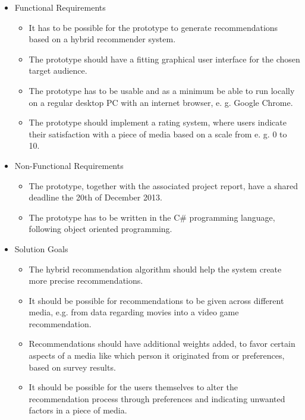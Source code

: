 \begin{itemize}
	\item Functional Requirements
	\begin{itemize}
		\item It has to be possible for the prototype to generate recommendations based on a hybrid recommender system.
		\item The prototype should have a fitting graphical user interface for the chosen target audience.
		\item The prototype has to be usable and as a minimum be able to run locally on a regular desktop PC with an internet browser, e. g. Google Chrome.
		\item The prototype should implement a rating system, where users indicate their satisfaction with a piece of media based on a scale from e. g. 0 to 10.
	\end{itemize}
	\item Non-Functional Requirements
	\begin{itemize}
		\item The prototype, together with the associated project report, have a shared deadline the 20th of December 2013.
		\item The prototype has to be written in the C\# programming language, following object oriented programming.
	\end{itemize}
	\item Solution Goals
	\begin{itemize}
		\item The hybrid recommendation algorithm should help the system create more precise recommendations.
		\item It should be possible for recommendations to be given across different media, e.g. from data regarding movies into a video game recommendation.
		\item Recommendations should have additional weights added, to favor certain aspects of a media like which person it originated from or preferences, based on survey results.
		\item It should be possible for the users themselves to alter the recommendation process through preferences and indicating unwanted factors in a piece of media.
	\end{itemize}
\end{itemize}
